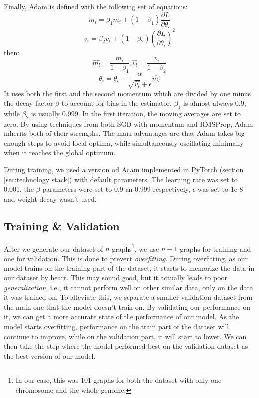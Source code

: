 \documentclass[times, utf8, diplomski, english]{fer_eng}
\begin{document}
Finally, Adam is defined with the following set of equations:
\[ m_i = \beta_1 m_i + (1 - \beta_1) \frac{\partial L}{\partial \theta_i} \]
\[ v_i = \beta_2 v_i + (1 - \beta_2) \left(\frac{\partial L}{\partial \theta_i}\right)^2 \]
then:
\[ \widehat{m_l} = \frac{m_i}{1 - \beta_1}, \widehat{v_l} = \frac{v_i}{1 - \beta_2} \]
\[ \theta_i = \theta_i - \frac{\alpha}{\sqrt{\widehat{v_l}} + \epsilon} \widehat{m_l} \]
It uses both the first and the second momentum which are divided by one minus the decay factor $\beta$ to account for bias in the estimator. $\beta_1$ is almost always 0.9, while $\beta_2$ is usually 0.999. In the first iteration, the moving averages are set to zero. By using techniques from both SGD with momentum and RMSProp, Adam inherits both of their strengths. The main advantages are that Adam takes big enough steps to avoid local optima, while simultaneously oscillating minimally when it reaches the global optimum.

During training, we used a version od Adam implemented in PyTorch (section \ref{sec:technology stack}) with default parameters. The learning rate was set to 0.001, the $\beta$ parameters were set to 0.9 an 0.999 respectively, $\epsilon$ was set to 1e-8 and weight decay wasn't used.

\subsection{Training \& Validation}
\label{subsec:the training process}

After we generate our dataset of $n$ graphs\footnote{In our case, this was 101 graphs for both the dataset with only one chromosome and the whole genome.}, we use $n - 1$ graphs for training and one for validation. This is done to prevent \textit{overfitting}. During overfitting, as our model trains on the training part of the dataset, it starts to memorize the data in our dataset by heart. This may sound good, but it actually leads to poor \textit{generalization}, i.e., it cannot perform well on other similar data, only on the data it was trained on. To alleviate this, we separate a smaller validation dataset from the main one that the model doesn't train on. By validating our performance on it, we can get a more accurate state of the performance of our model. As the model starts overfitting, performance on the train part of the dataset will continue to improve, while on the validation part, it will start to lower. We can then take the step where the model performed best on the validation dataset as the best version of our model.
\end{document}
